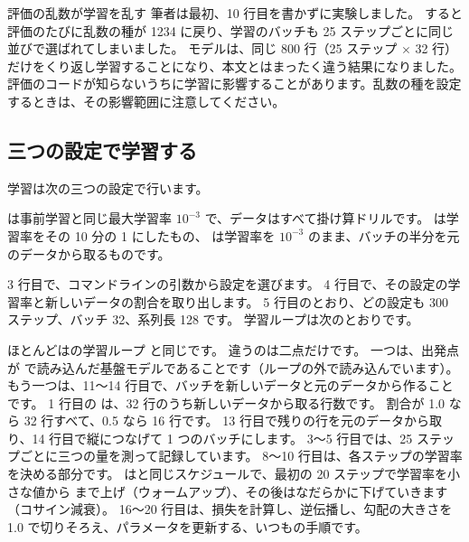 \begin{caution}{評価の乱数が学習を乱す}
筆者は最初、10 行目を書かずに実験しました。
すると評価のたびに乱数の種が 1234 に戻り、学習のバッチも 25 ステップごとに同じ並びで選ばれてしまいました。
モデルは、同じ 800 行（25 ステップ $\times$ 32 行）だけをくり返し学習することになり、本文とはまったく違う結果になりました。
評価のコードが知らないうちに学習に影響することがあります。乱数の種を設定するときは、その影響範囲に注意してください。
\end{caution}

\subsection{三つの設定で学習する}

学習は次の三つの設定で行います。


 は事前学習と同じ最大学習率 $10^{-3}$ で、データはすべて掛け算ドリルです。
 は学習率をその 10 分の 1 にしたもの、 は学習率を $10^{-3}$ のまま、バッチの半分を元のデータから取るものです。

3 行目で、コマンドラインの引数から設定を選びます。
4 行目で、その設定の学習率と新しいデータの割合を取り出します。
5 行目のとおり、どの設定も 300 ステップ、バッチ 32、系列長 128 です。
学習ループは次のとおりです。


ほとんどはの学習ループ  と同じです。
違うのは二点だけです。
一つは、出発点が  で読み込んだ基盤モデルであることです（ループの外で読み込んでいます）。
もう一つは、11〜14 行目で、バッチを新しいデータと元のデータから作ることです。
1 行目の  は、32 行のうち新しいデータから取る行数です。
割合が 1.0 なら 32 行すべて、0.5 なら 16 行です。
13 行目で残りの行を元のデータから取り、14 行目で縦につなげて 1 つのバッチにします。
3〜5 行目では、25 ステップごとに三つの量を測って記録しています。
8〜10 行目は、各ステップの学習率を決める部分です。
 はと同じスケジュールで、最初の 20 ステップで学習率を小さな値から  まで上げ（ウォームアップ）、その後はなだらかに下げていきます（コサイン減衰）。
16〜20 行目は、損失を計算し、逆伝播し、勾配の大きさを 1.0 で切りそろえ、パラメータを更新する、いつもの手順です。

